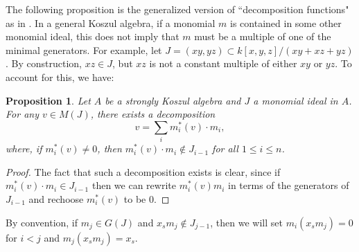 \documentclass[10pt]{amsart}
\newtheorem{prop}[theorem]{Proposition}
\theoremstyle{definition}
\newtheorem{definition}[theorem]{Definition}
\theoremstyle{remark}
\newtheorem{the context}[theorem]{The Context}
\numberwithin{equation}{theorem}
\numberwithin{equation}{section}
\newcommand{\keller}[1]{{\color{orange} \sf KELLER: [#1]}}
\renewcommand{\leq}{\leqslant}
\begin{document}
The following proposition is the generalized version of ``decomposition functions" as in \cite{herzog2002resolutions}. In a general Koszul algebra, if a monomial $m$ is contained in some other monomial ideal, this does not imply that $m$ must be a multiple of one of the minimal generators. For example, let $J = (xy,yz) \subset k[x,y,z]/(xy+xz+yz)$. By construction, $xz \in J$, but $xz$ is not a constant multiple of either $xy$ or $yz$. To account for this, we have:

\begin{prop}\label{prop:theDecomp}
Let $A$ be a strongly Koszul algebra and $J$ a monomial ideal in $A$. For any $v \in M(J)$, there exists a decomposition
$$v = \sum_i m_i^* (v) \cdot m_i,$$
where, if $m_i^* (v) \neq 0$, then $m_i^* (v) \cdot m_i \notin J_{i-1}$ for all $1 \leq i \leq n$.
\end{prop}

\begin{proof}
The fact that such a decomposition exists is clear, since if $m_i^* (v) \cdot m_i \in J_{i-1}$ then we can rewrite $m_i^* (v) m_i$ in terms of the generators of $J_{i-1}$ and rechoose $m_i^* (v)$ to be $0$.
\end{proof}

By convention, if $m_j \in G(J)$ and $x_s m_j \notin J_{j-1}$, then we will set $m_i (x_s m_j) = 0$ for $i < j$ and $m_j (x_s m_j) = x_s$.




\end{document}
